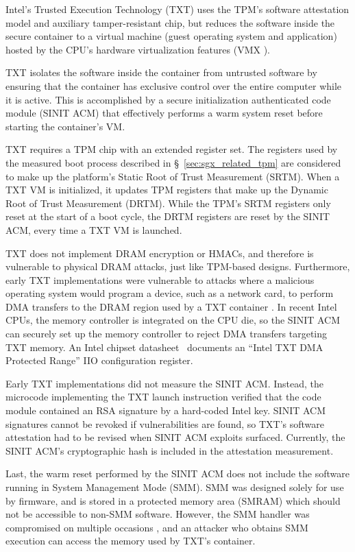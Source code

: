 \label{sec:sgx_related_intel_txt}

Intel's Trusted Execution Technology (TXT) \cite{grawrock2009txt} uses the
TPM's software attestation model and auxiliary tamper-resistant chip, but
reduces the software inside the secure container to a virtual machine (guest
operating system and application) hosted by the CPU's hardware virtualization
features (VMX \cite{uhlig2005vmx}).

TXT isolates the software inside the container from untrusted software by
ensuring that the container has exclusive control over the entire computer
while it is active. This is accomplished by a secure initialization
authenticated code module (SINIT ACM) that effectively performs a warm system
reset before starting the container's VM.

TXT requires a TPM chip with an extended register set. The registers used by
the measured boot process described in \S~\ref{sec:sgx_related_tpm} are
considered to make up the platform's Static Root of Trust Measurement (SRTM).
When a TXT VM is initialized, it updates TPM registers that make up the Dynamic
Root of Trust Measurement (DRTM). While the TPM's SRTM registers only reset at
the start of a boot cycle, the DRTM registers are reset by the SINIT ACM, every
time a TXT VM is launched.

TXT does not implement DRAM encryption or HMACs, and therefore is vulnerable to
physical DRAM attacks, just like TPM-based designs. Furthermore, early TXT
implementations were vulnerable to attacks where a malicious operating system
would program a device, such as a network card, to perform DMA transfers
to the DRAM region used by a TXT container \cite{wojtczuk2009txt,
wojtczuk2009txt2}. In recent Intel CPUs, the memory controller is integrated on
the CPU die, so the SINIT ACM can securely set up the memory controller to
reject DMA transfers targeting TXT memory. An Intel chipset
datasheet~\cite{intel2015datasheet} documents an ``Intel TXT DMA Protected
Range'' IIO configuration register.

Early TXT implementations did not measure the SINIT ACM. Instead, the microcode
implementing the TXT launch instruction verified that the code module contained
an RSA signature by a hard-coded Intel key. SINIT ACM signatures cannot be
revoked if vulnerabilities are found, so TXT's software attestation had to be
revised when SINIT ACM exploits \cite{wojtczuk2011txt} surfaced. Currently, the
SINIT ACM's cryptographic hash is included in the attestation measurement.

Last, the warm reset performed by the SINIT ACM does not include the software
running in System Management Mode (SMM). SMM was designed solely for use by
firmware, and is stored in a protected memory area (SMRAM) which should not be
accessible to non-SMM software. However, the SMM handler was compromised on
multiple occasions \cite{duflot2006smm, rutkowska2008remap, wojtczuk2009smm,
wecherowski2009smm, embleton2010smm}, and an attacker who obtains SMM execution
can access the memory used by TXT's container.
